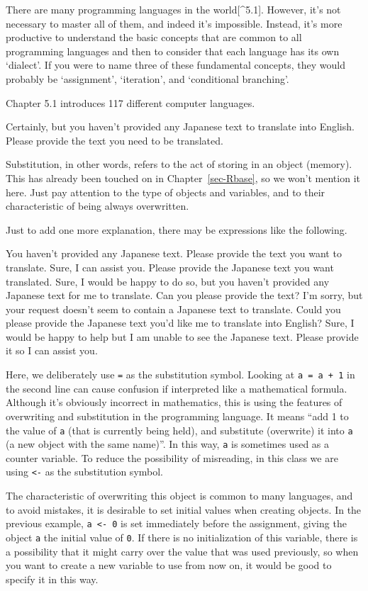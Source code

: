\documentclass[
  a4paper,
]{book}
\begin{document}
There are many programming languages in the world{[}\^{}5.1{]}. However,
it's not necessary to master all of them, and indeed it's impossible.
Instead, it's more productive to understand the basic concepts that are
common to all programming languages and then to consider that each
language has its own `dialect'. If you were to name three of these
fundamental concepts, they would probably be `assignment', `iteration',
and `conditional branching'.

Chapter 5.1 introduces 117 different computer languages.

Certainly, but you haven't provided any Japanese text to translate into
English. Please provide the text you need to be translated.

Substitution, in other words, refers to the act of storing in an object
(memory). This has already been touched on in Chapter~\ref{sec-Rbase},
so we won't mention it here. Just pay attention to the type of objects
and variables, and to their characteristic of being always overwritten.

Just to add one more explanation, there may be expressions like the
following.

You haven't provided any Japanese text. Please provide the text you want
to translate. Sure, I can assist you. Please provide the Japanese text
you want translated. Sure, I would be happy to do so, but you haven't
provided any Japanese text for me to translate. Can you please provide
the text? I'm sorry, but your request doesn't seem to contain a Japanese
text to translate. Could you please provide the Japanese text you'd like
me to translate into English? Sure, I would be happy to help but I am
unable to see the Japanese text. Please provide it so I can assist you.

Here, we deliberately use \texttt{=} as the substitution symbol. Looking
at \texttt{a\ =\ a\ +\ 1} in the second line can cause confusion if
interpreted like a mathematical formula. Although it's obviously
incorrect in mathematics, this is using the features of overwriting and
substitution in the programming language. It means ``add 1 to the value
of \texttt{a} (that is currently being held), and substitute (overwrite)
it into \texttt{a} (a new object with the same name)''. In this way,
\texttt{a} is sometimes used as a counter variable. To reduce the
possibility of misreading, in this class we are using
\texttt{\textless{}-} as the substitution symbol.

The characteristic of overwriting this object is common to many
languages, and to avoid mistakes, it is desirable to set initial values
when creating objects. In the previous example,
\texttt{a\ \textless{}-\ 0} is set immediately before the assignment,
giving the object \texttt{a} the initial value of \texttt{0}. If there
is no initialization of this variable, there is a possibility that it
might carry over the value that was used previously, so when you want to
create a new variable to use from now on, it would be good to specify it
in this way.
\end{document}
